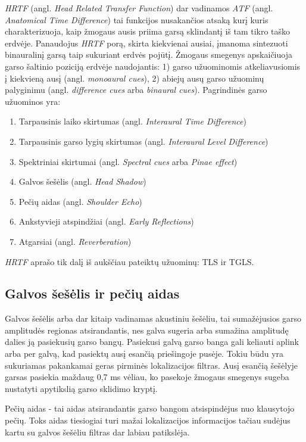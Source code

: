 \documentclass[]{vgtuef}
\begin{document}
\textit{HRTF} (angl. \textit{Head Related Transfer Function}) dar vadinamos \textit{ATF} (angl. \textit{Anatomical Time Difference}) tai funkcijos nusakančios atsaką kurį kuris charakterizuoja, kaip žmogaus ausis priima garsą sklindantį iš tam tikro taško erdvėje. Panaudojus \textit{HRTF} porą, skirta kiekvienai ausiai, įmanoma sintezuoti binauralinį garsą taip sukuriant erdvės pojūtį.  
Žmogaus smegenys apskaičiuoja garso šaltinio poziciją erdvėje naudojantis: 1) garso užuominomis atkeliavusiomis į kiekvieną ausį (angl. \textit{monoaural cues}), 2) abiejų ausų garso užuominų palyginimu (angl. \textit{difference cues} arba \textit{binaural cues}). Pagrindinės garso užuominos yra:
\begin{enumerate}
\item Tarpausinis laiko skirtumas (angl. \textit{Interaural Time Difference})
\item Tarpausinis garso lygių skirtumas (angl. \textit{Interaural Level Difference})
\item Spektriniai skirtumai (angl. \textit{Spectral cues} arba \textit{Pinae effect})
\item Galvos šešėlis (angl. \textit{Head Shadow})
\item Pečių aidas (angl. \textit{Shoulder Echo})
\item Ankstyvieji atspindžiai (angl. \textit{Early Reflections})
\item Atgarsiai (angl. \textit{Reverberation})
\end{enumerate}

\textit{HRTF} aprašo tik dalį iš aukščiau pateiktų užuominų: TLS ir TGLS.


\subsection{Galvos šešėlis ir pečių aidas}

Galvos šešėlis arba dar kitaip vadinamas akustiniu šešėliu, tai sumažėjusios garso amplitudės regionas atsirandantis, nes galva sugeria arba sumažina amplitudę dalies ją pasiekusių garso bangų. Pasiekusi galvą garso banga gali keliauti aplink arba per galvą, kad pasiektų ausį esančią priešingoje pusėje. Tokiu būdu yra sukuriamas pakankamai geras pirminės lokalizacijos filtras. Ausį esančią šešėlyje garsas pasiekia maždaug 0,7 ms vėliau, ko pasekoje žmogaus smegenys sugeba nustatyti apytikslią garso sklidimo kryptį. 

Pečių aidas - tai aidas atsirandantis garso bangom atsispindėjus nuo klausytojo pečių. Toks aidas tiesiogiai turi mažai lokalizacijos informacijos tačiau sudėjus kartu su galvos šešėliu filtras dar labiau patikslėja.
\end{document}
